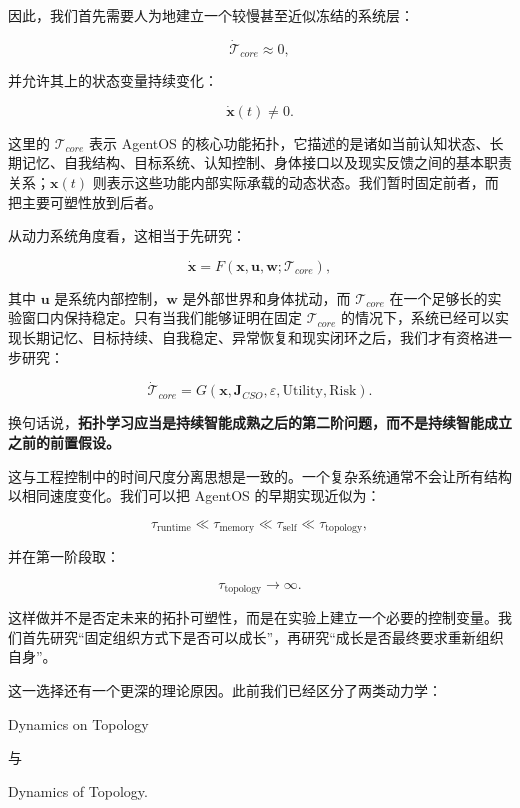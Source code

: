 因此，我们首先需要人为地建立一个较慢甚至近似冻结的系统层：

\[
\boxed{
\dot{\mathcal{T}}_{core}\approx 0,
}
\]

并允许其上的状态变量持续变化：

\[
\boxed{
\dot{\mathbf{x}}(t)\neq 0.
}
\]

这里的 $\mathcal{T}_{core}$ 表示 AgentOS 的核心功能拓扑，它描述的是诸如当前认知状态、长期记忆、自我结构、目标系统、认知控制、身体接口以及现实反馈之间的基本职责关系；$\mathbf{x}(t)$ 则表示这些功能内部实际承载的动态状态。我们暂时固定前者，而把主要可塑性放到后者。

从动力系统角度看，这相当于先研究：

\[
\dot{\mathbf{x}}
=
F\left(
\mathbf{x},
\mathbf{u},
\mathbf{w};
\mathcal{T}_{core}
\right),
\]

其中 $\mathbf{u}$ 是系统内部控制，$\mathbf{w}$ 是外部世界和身体扰动，而 $\mathcal{T}_{core}$ 在一个足够长的实验窗口内保持稳定。只有当我们能够证明在固定 $\mathcal{T}_{core}$ 的情况下，系统已经可以实现长期记忆、目标持续、自我稳定、异常恢复和现实闭环之后，我们才有资格进一步研究：

\[
\dot{\mathcal{T}}_{core}
=
G(
\mathbf{x},
\mathbf{J}_{CSO},
\varepsilon,
\text{Utility},
\text{Risk}
).
\]

换句话说，\textbf{拓扑学习应当是持续智能成熟之后的第二阶问题，而不是持续智能成立之前的前置假设。}

这与工程控制中的时间尺度分离思想是一致的。一个复杂系统通常不会让所有结构以相同速度变化。我们可以把 AgentOS 的早期实现近似为：

\[
\tau_{\text{runtime}}
\ll
\tau_{\text{memory}}
\ll
\tau_{\text{self}}
\ll
\tau_{\text{topology}},
\]

并在第一阶段取：

\[
\tau_{\text{topology}}\rightarrow\infty.
\]

这样做并不是否定未来的拓扑可塑性，而是在实验上建立一个必要的控制变量。我们首先研究“固定组织方式下是否可以成长”，再研究“成长是否最终要求重新组织自身”。

这一选择还有一个更深的理论原因。此前我们已经区分了两类动力学：

\begin{statementbox}
Dynamics on Topology
\end{statementbox}

与

\begin{statementbox}
Dynamics of Topology.
\end{statementbox}

